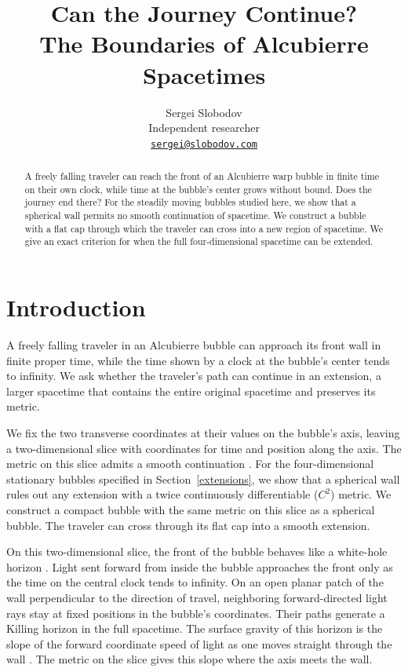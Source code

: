 \documentclass[12pt]{article}
\begin{document}
\title{Can the Journey Continue?\\
The Boundaries of Alcubierre Spacetimes}
\author{Sergei Slobodov\\
Independent researcher\\
\href{mailto:sergei@slobodov.com}{\texttt{sergei@slobodov.com}}}
\date{}
\maketitle

\begin{abstract}
A freely falling traveler can reach the front of an Alcubierre warp
bubble in finite time on their own clock, while time at the bubble's
center grows without bound. Does the journey end there? For the steadily
moving bubbles studied here, we show that a spherical wall permits no
smooth continuation of spacetime. We construct a bubble with a flat cap
through which the traveler can cross into a new region of spacetime.
We give an exact criterion for when the full four-dimensional spacetime
can be extended.
\end{abstract}

\section{Introduction}

A freely falling traveler in an Alcubierre bubble \cite{Alcubierre1994}
can approach its front wall in finite proper time, while the time shown
by a clock at the bubble's center tends to infinity. We ask whether the
traveler's path can continue in an extension, a larger spacetime that
contains the entire original spacetime and preserves its metric.

We fix the two transverse coordinates at their values on the bubble's
axis, leaving a two-dimensional slice with coordinates for time and
position along the axis. The metric on this slice admits a smooth
continuation \cite{FinazziLiberatiBarcelo2009}.
For the four-dimensional stationary bubbles specified in
Section~\ref{extensions}, we show that a spherical wall rules out any
extension with a twice continuously differentiable (\(C^2\)) metric.
We construct a compact bubble with the same metric on this slice as a
spherical bubble. The traveler can cross through its flat cap into a
smooth extension.

On this two-dimensional slice, the front of the bubble behaves like a
white-hole horizon \cite[Sec.~2 and Fig.~1]{BarceloEtAl2022}. Light sent
forward from inside the bubble approaches the front only as the time on
the central clock tends to infinity. On an open planar patch of the wall
perpendicular to the direction of travel,
neighboring forward-directed light rays stay at fixed positions in the
bubble's coordinates. Their paths generate a Killing horizon in the
full spacetime.
The surface gravity of this horizon is the slope of the forward coordinate
speed of light as one moves straight through the wall
\cite[cf. Eq.~(13)]{FinazziLiberatiBarcelo2009}. The metric on the slice
gives this slope where the axis meets the wall.
\end{document}
